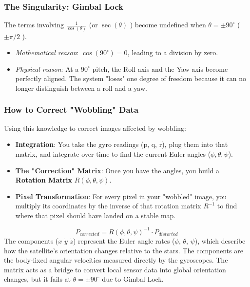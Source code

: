 \documentclass[a4paper,10pt]{article}
\begin{document}
\subsubsection{The Singularity: Gimbal Lock}
The terms involving \( \frac{1}{\cos(\theta)}\) (or \(\sec(\theta)\) ) become undefined when
\(\theta = \pm 90^{\circ}\) (\(\pm \pi/2\) ).
\begin{itemize}
\item \emph{Mathematical reason}: \( \cos(90^{\circ}) = 0\), leading to a division by zero.
\item \emph{Physical reason}: At a \(90^{\circ}\) pitch, the Roll axis and the Yaw axis become perfectly aligned. The system "loses" one degree of freedom because it can no longer distinguish between a roll and a yaw.
\end{itemize}
\subsubsection{How to Correct "Wobbling" Data}
Using this knowledge to correct images affected by wobbling:
\begin{itemize}
\item \textbf{Integration}: You take the gyro readings (p, q, r), plug them into that matrix, and integrate over time to find the current Euler angles (\(\phi, \theta,\psi\)).
\item \textbf{The "Correction" Matrix}: Once you have the angles, you build a \textbf{Rotation Matrix} \( R(\phi,\theta,\psi) \).
\item \textbf{Pixel Transformation}: For every pixel in your "wobbled" image, you multiply its coordinates by the inverse of that rotation matrix \( R^{-1} \) to find where that pixel should have landed on a stable map.
\end{itemize}
\[  P_{corrected} = R(\phi,\theta,\psi)^{-1} \cdot P_{distorted} \]
The components (\(\dot{x}\,\, \dot{y}\,\, \dot{z}\)) represent the Euler angle rates (\( \phi,\, \theta,\, \psi\)), which describe how the satellite's orientation changes relative to the stars. The components are the body-fixed angular velocities measured directly by the gyroscopes. The matrix acts as a bridge to convert local sensor data into global orientation changes, but it fails at \( \theta = \pm90^{\circ}\) due to Gimbal Lock.
\end{document}
